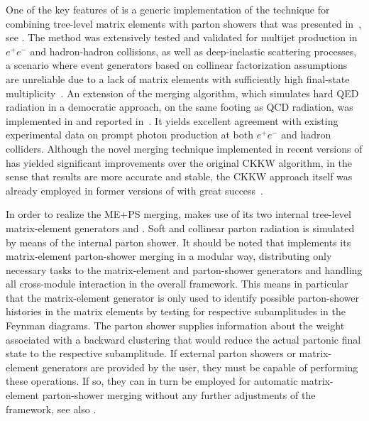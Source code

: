 \label{Sec:meps_sherpa}
One of the key features of \Sherpa is a generic implementation of the 
technique for combining tree-level matrix elements with parton showers
that was presented in~\cite{Hoeche:2009rj}, see . 
The method was extensively tested and validated for multijet production in 
$e^+e^-$ and hadron-hadron 
collisions, as well as deep-inelastic scattering processes, a scenario where 
event generators based on collinear factorization assumptions 
are unreliable due to a lack of matrix elements with sufficiently 
high final-state multiplicity~\cite{Carli:2010cg}.
An extension of the merging algorithm, which simulates hard QED radiation 
in a democratic approach, \ie on the same footing as QCD radiation, 
was implemented in \Sherpa and reported in~\cite{Hoeche:2009xc}. 
It yields excellent agreement with existing experimental data on prompt
photon production at both $e^+e^-$ and hadron colliders.
Although the novel merging technique implemented in recent versions of \Sherpa
has yielded significant improvements over the original CKKW algorithm,
in the sense that results are more accurate and stable, the CKKW approach
itself was already employed in former versions of \Sherpa with 
great success~\cite{Krauss:2004bs,Krauss:2005nu,Gleisberg:2005qq,Alwall:2007fs}.

In order to realize the ME+PS merging, \Sherpa makes use of its two 
internal tree-level matrix-element generators \Amegic and \Comix. Soft and 
collinear parton radiation is simulated by means of the internal parton 
shower. It should be noted that \Sherpa implements its matrix-element 
parton-shower merging in a modular way, distributing only necessary tasks to 
the matrix-element and parton-shower generators and handling all cross-module
interaction in the overall framework. This means in particular that the
matrix-element generator is only used to identify possible parton-shower
histories in the matrix elements by testing for respective subamplitudes
in the Feynman diagrams. The parton shower supplies information about 
the weight associated with a backward clustering that would reduce the 
actual partonic final state to the respective subamplitude. If external 
parton showers or matrix-element generators are provided by the user,
they must be capable of performing these operations. If so, they can in turn
be employed for automatic matrix-element parton-shower merging without 
any further adjustments of the \Sherpa framework, 
see also .

